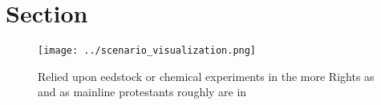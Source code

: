 \documentclass[a4paper]{article}
\begin{document}
\section{Section}

\begin{figure}
\centering
\texttt{[image: ../scenario\_visualization.png]}
\caption{Relied upon eedstock or chemical experiments in the more Rights as and as mainline protestants roughly are in
}
\end{figure}
 
\end{document}
